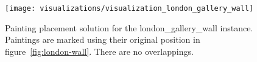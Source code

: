 \begin{figure}[h!]
    \texttt{[image: visualizations/visualization\_london\_gallery\_wall]}
    \caption[Painting placement solution for the london\_gallery\_wall instance]
        { Painting placement solution for the london\_gallery\_wall instance.
    Paintings are marked using their original position in figure~\ref{fig:london-wall}.
    There are no overlappings.}
    \label{fig:results:visualization-london-gallery-wall}
\end{figure}


